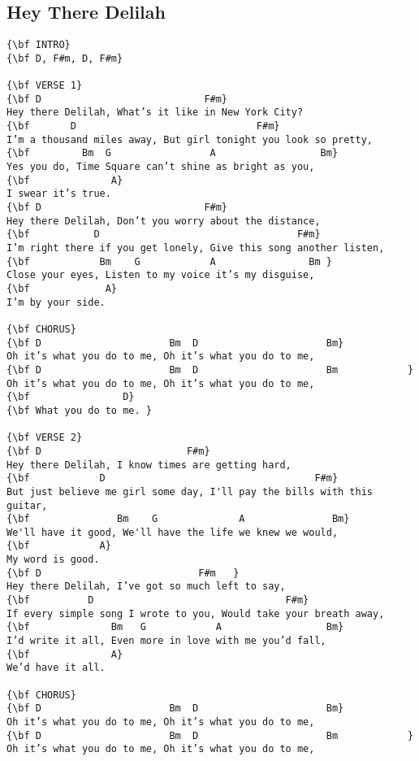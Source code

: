 \documentclass[a4paper]{article}
\begin{document}
\subsection{Hey There Delilah} %
\label{sub:Hey There Delil}
\begin{Verbatim}[commandchars=\\\{\}]
{\bf INTRO}
{\bf D, F#m, D, F#m}

{\bf VERSE 1}
{\bf D                            F#m}
Hey there Delilah, What’s it like in New York City? 
{\bf       D                               F#m}
I’m a thousand miles away, But girl tonight you look so pretty, 
{\bf         Bm  G                 A                  Bm}
Yes you do, Time Square can’t shine as bright as you, 
{\bf              A}
I swear it’s true. 
{\bf D                            F#m}
Hey there Delilah, Don’t you worry about the distance, 
{\bf           D                                  F#m}
I’m right there if you get lonely, Give this song another listen, 
{\bf            Bm    G            A                Bm }
Close your eyes, Listen to my voice it’s my disguise, 
{\bf             A}
I’m by your side. 

{\bf CHORUS}
{\bf D                      Bm  D                      Bm}
Oh it’s what you do to me, Oh it’s what you do to me, 
{\bf D                      Bm  D                      Bm            }
Oh it’s what you do to me, Oh it’s what you do to me, 
{\bf                D}
{\bf What you do to me. }

{\bf VERSE 2}
{\bf D                         F#m}
Hey there Delilah, I know times are getting hard, 
{\bf            D                                    F#m}
But just believe me girl some day, I'll pay the bills with this guitar, 
{\bf               Bm    G              A               Bm}
We'll have it good, We'll have the life we knew we would, 
{\bf            A}
My word is good. 
{\bf D                           F#m   }
Hey there Delilah, I’ve got so much left to say, 
{\bf          D                                 F#m}
If every simple song I wrote to you, Would take your breath away, 
{\bf              Bm   G            A                  Bm}
I’d write it all, Even more in love with me you’d fall, 
{\bf              A}
We’d have it all. 

{\bf CHORUS}
{\bf D                      Bm  D                      Bm}
Oh it’s what you do to me, Oh it’s what you do to me, 
{\bf D                      Bm  D                      Bm            }
Oh it’s what you do to me, Oh it’s what you do to me, 


\end{Verbatim}
\end{document}
